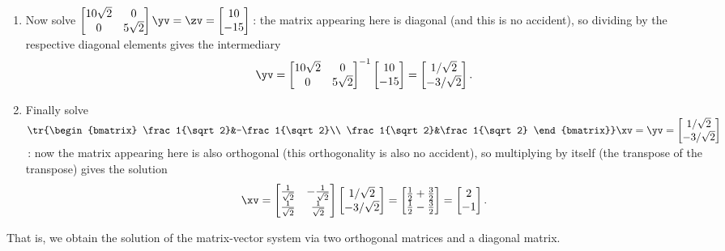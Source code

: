 \begin{example}
\begin{solution}
\begin{enumerate}
\item Now solve \(\begin{bmatrix} 10\sqrt2&0\\0&5\sqrt2 \end{bmatrix}\yv=\zv=\begin{bmatrix} 10\\-15 \end{bmatrix}\)\,:  the matrix appearing here is diagonal (and this is no accident), so dividing by the respective diagonal elements gives the intermediary
\begin{equation*}
\yv=\begin{bmatrix} 10\sqrt2&0\\0&5\sqrt2 \end{bmatrix}^{-1}
\begin{bmatrix} 10\\-15 \end{bmatrix}
=\begin{bmatrix} 1/\sqrt2\\-3/\sqrt2 \end{bmatrix}.
\end{equation*}

\item Finally solve \(\tr{\begin{bmatrix} \frac1{\sqrt2}&-\frac1{\sqrt2}\\ \frac1{\sqrt2}&\frac1{\sqrt2} \end{bmatrix}}\xv=\yv=\begin{bmatrix} 1/\sqrt2\\-3/\sqrt2 \end{bmatrix}\)\,: now the matrix appearing here is also orthogonal (this orthogonality is also no accident), so multiplying by itself (the transpose of the transpose) gives the solution
\begin{equation*}
\xv=\begin{bmatrix} \frac1{\sqrt2}&-\frac1{\sqrt2}\\ \frac1{\sqrt2}&\frac1{\sqrt2} \end{bmatrix}
\begin{bmatrix} 1/\sqrt2\\-3/\sqrt2 \end{bmatrix}
=\begin{bmatrix} \frac12+\frac32\\\frac12-\frac32 \end{bmatrix}
=\begin{bmatrix} 2\\-1 \end{bmatrix}.
\end{equation*}

\end{enumerate}
That is, we obtain the solution of the matrix-vector system via two orthogonal matrices and a diagonal matrix.
\end{solution}
\end{example}






